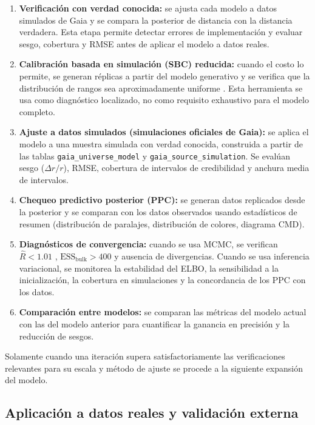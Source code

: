 \documentclass[stu, 12pt, letterpaper, donotrepeattitle, floatsintext, natbib]{apa7_ula}
\begin{document}
\begin{enumerate}
    \item \textbf{Verificación con verdad conocida:}
    se ajusta cada modelo a datos simulados de Gaia y se compara la
    posterior de distancia con la distancia verdadera. Esta etapa
    permite detectar errores de implementación y evaluar sesgo,
    cobertura y RMSE antes de aplicar el modelo a datos reales.
    \item \textbf{Calibración basada en simulación (SBC) reducida:}
    cuando el costo lo permite, se generan réplicas a partir del
    modelo generativo y se verifica que la distribución de rangos sea
    aproximadamente uniforme \citep{Talts_2018}. Esta herramienta se
    usa como diagnóstico localizado, no como requisito exhaustivo para
    el modelo completo.
    \item \textbf{Ajuste a datos simulados (simulaciones oficiales de Gaia):}
    se aplica el modelo a una muestra simulada con verdad conocida,
    construida a partir de las tablas
    \texttt{gaia\_universe\_model} y
    \texttt{gaia\_source\_simulation}. Se evalúan sesgo
    ($\Delta r / r$), RMSE, cobertura de intervalos de credibilidad y
    anchura media de intervalos.
    \item \textbf{Chequeo predictivo posterior (PPC):}
    se generan datos replicados desde la posterior y se comparan con
    los datos observados usando estadísticos de resumen (distribución
    de paralajes, distribución de colores, diagrama CMD).
    \item \textbf{Diagnósticos de convergencia:}
    cuando se usa MCMC, se verifican $\hat{R} < 1.01$
    \citep{Vehtari_Rhat_2021}, $\text{ESS}_{\text{bulk}} > 400$ y
    ausencia de divergencias. Cuando se usa inferencia variacional,
    se monitorea la estabilidad del ELBO, la sensibilidad a la
    inicialización, la cobertura en simulaciones y la concordancia de
    los PPC con los datos.
    \item \textbf{Comparación entre modelos:}
    se comparan las métricas del modelo actual con las del modelo
    anterior para cuantificar la ganancia en precisión y la reducción
    de sesgos.
\end{enumerate}

Solamente cuando una iteración supera satisfactoriamente las
verificaciones relevantes para su escala y método de ajuste se procede
a la siguiente expansión del modelo.

\subsection{Aplicación a datos reales y validación externa}
\end{document}
